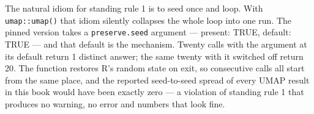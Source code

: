 \documentclass[
  british,
  a4paper,
]{book}
\newenvironment{Shaded}{\begin{snugshade}}{\end{snugshade}}
\newcommand{\AttributeTok}[1]{\textcolor[rgb]{0.13,0.29,0.53}{#1}}
\newcommand{\ConstantTok}[1]{\textcolor[rgb]{0.56,0.35,0.01}{#1}}
\newcommand{\ControlFlowTok}[1]{\textcolor[rgb]{0.13,0.29,0.53}{\textbf{#1}}}
\newcommand{\DataTypeTok}[1]{\textcolor[rgb]{0.13,0.29,0.53}{#1}}
\newcommand{\DecValTok}[1]{\textcolor[rgb]{0.00,0.00,0.81}{#1}}
\newcommand{\FloatTok}[1]{\textcolor[rgb]{0.00,0.00,0.81}{#1}}
\newcommand{\FunctionTok}[1]{\textcolor[rgb]{0.13,0.29,0.53}{\textbf{#1}}}
\newcommand{\NormalTok}[1]{#1}
\newcommand{\OtherTok}[1]{\textcolor[rgb]{0.56,0.35,0.01}{#1}}
\newcommand{\SpecialCharTok}[1]{\textcolor[rgb]{0.81,0.36,0.00}{\textbf{#1}}}
\newcommand{\StringTok}[1]{\textcolor[rgb]{0.31,0.60,0.02}{#1}}
\begin{document}
\begin{Shaded}
\end{Shaded}

The natural idiom for standing rule 1 is to seed once and loop. With
\texttt{umap::umap()} that idiom silently collapses the whole loop into one run. The
pinned version takes a \texttt{preserve.seed} argument --- present:
TRUE, default: TRUE --- and that default is the mechanism.
Twenty calls with the argument at its default return
1 distinct answer; the same twenty with it switched off
return 20. The function restores R's random state on
exit, so consecutive calls all start from the same place, and the reported
seed-to-seed spread of every UMAP result in this book would have been exactly
zero --- a violation of standing rule 1 that produces no warning, no error and
numbers that look fine.
\end{document}
